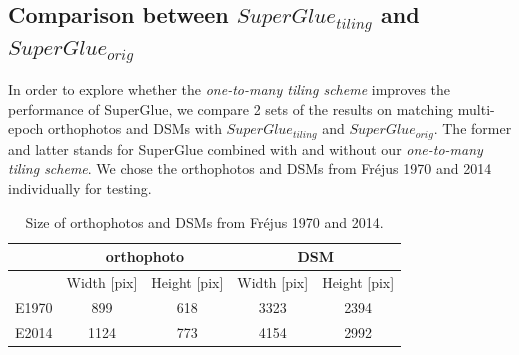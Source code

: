 \subsection{Comparison between $SuperGlue_{tiling}$ and $SuperGlue_{orig}$}
\label{Compare2SpGs}
In order to explore whether the \textit{one-to-many tiling scheme} improves the performance of SuperGlue, 
we compare 2 sets of the results on matching multi-epoch orthophotos and \ac{DSM}s with $SuperGlue_{tiling}$ and $SuperGlue_{orig}$. The former and latter stands for SuperGlue combined with and without our \textit{one-to-many tiling scheme}. %
We chose the orthophotos and \ac{DSM}s from Fr{\'e}jus 1970 and 2014 individually for testing.\\
\begin{table}%
	\centering
	\begin{tabular}{||l|c|c|c|c||}\hline
		 & \multicolumn{2}{c|}{orthophoto} & \multicolumn{2}{c||}{\ac{DSM}} \\\hline
		 & Width [pix] & Height [pix] & Width [pix] & Height [pix] \\\hline\hline
		E1970 & 899 & 618 & 3323 & 2394 \\\hline
		E2014 & 1124 & 773 & 4154 & 2992 \\\hline
	\end{tabular}
	\caption{Size of orthophotos and \ac{DSM}s from Fr{\'e}jus 1970 and 2014.}
	\label{ImgSize}
\end{table}
